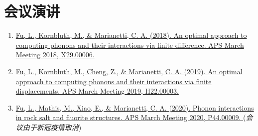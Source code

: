\documentclass[
  a4paper,
  12pt
]{cv}
\begin{document}
%


\section{会议演讲}

\begin{enumerate}
\item
\href{https://meetings.aps.org/Meeting/MAR18/Event/322388}{
Fu, L., Kornbluth, M., \& Marianetti, C. A. (2018).
An optimal approach to computing phonons and their interactions via finite difference.
APS March Meeting 2018, X29.00006.
}
%
\item
\href{https://meetings.aps.org/Meeting/MAR19/Session/H22.3}{
Fu, L., Kornbluth, M., Cheng, Z., \& Marianetti, C. A. (2019).
An optimal approach to computing phonons and their interactions via finite displacements.
APS March Meeting 2019, H22.00003.
}
%
\item
\href{https://meetings.aps.org/Meeting/MAR20/Session/P44.9}{
Fu, L., Mathis, M., Xiao, E., \& Marianetti, C. A. (2020).
Phonon interactions in rock salt and fluorite structures.
APS March Meeting 2020, P44.00009.
} (\emph{会议由于新冠疫情取消})
\end{enumerate}
\end{document}
